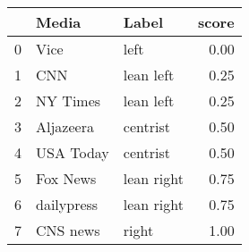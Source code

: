 \begin{tabular}{lllr}
\toprule
{} &       Media &       Label &  score \\
\midrule
0 &        Vice &        left &   0.00 \\
1 &         CNN &   lean left &   0.25 \\
2 &    NY Times &   lean left &   0.25 \\
3 &   Aljazeera &    centrist &   0.50 \\
4 &   USA Today &    centrist &   0.50 \\
5 &    Fox News &  lean right &   0.75 \\
6 &  dailypress &  lean right &   0.75 \\
7 &    CNS news &       right &   1.00 \\
\bottomrule
\end{tabular}
